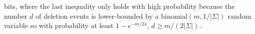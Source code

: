 \documentclass{patmorin}
\newcommand{\floor}[1]{\lfloor #1\rfloor}
\begin{document}
bits, where the last inequality only holds with high probability because the number $d$ of deletion events is lower-bounded by a $\mathrm{binomial}(m,1/|\Sigma|)$ random variable so with probability at least $1-e^{-m/24}$, $d\ge m/(2|\Sigma|)$..
\end{document}
